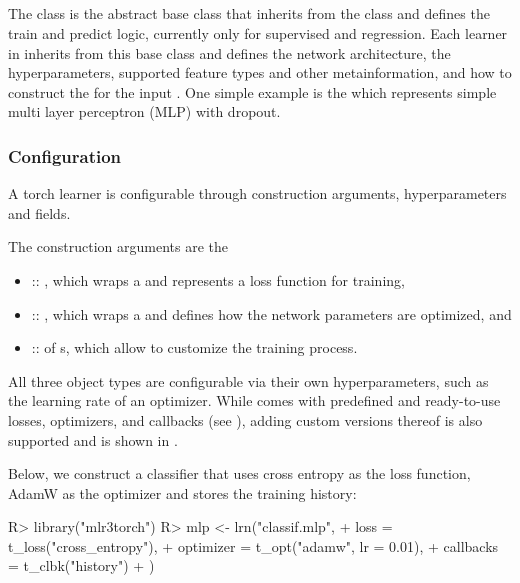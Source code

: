 \documentclass[article]{jss}
\theoremstyle{definition}
\begin{document}
\subsection[LearnerTorch]{}

The   class is the abstract base class that inherits from the  class and defines the train and predict logic, currently only for supervised and regression.
Each learner in  inherits from this base class and defines the network architecture, the hyperparameters, supported feature types and other metainformation, and how to construct the  for the input .
One simple example is the  which represents simple multi layer perceptron (MLP) with dropout.

\subsubsection{Configuration}

A torch learner is configurable through construction arguments, hyperparameters and fields.

The construction arguments are the
\begin{itemize}
    \item {} :: , which wraps a  and represents a loss function for training,
    \item {} :: , which wraps a  and defines how the network parameters are optimized, and
    \item {} ::  of s, which allow to customize the training process.
\end{itemize}

All three object types are configurable via their own hyperparameters, such as the learning rate of an optimizer.
While  comes with predefined and ready-to-use losses, optimizers, and callbacks (see ), adding custom versions thereof is also supported and is shown in .

Below, we construct a  classifier that uses cross entropy as the loss function, AdamW as the optimizer \citep{ref-loshchilov2017decoupled} and stores the training history:

\begin{CodeInput}
R> library("mlr3torch")
R> mlp <- lrn("classif.mlp",
+   loss = t_loss("cross_entropy"),
+   optimizer = t_opt("adamw", lr = 0.01),
+   callbacks = t_clbk("history")
+  )
\end{CodeInput}
\end{document}
